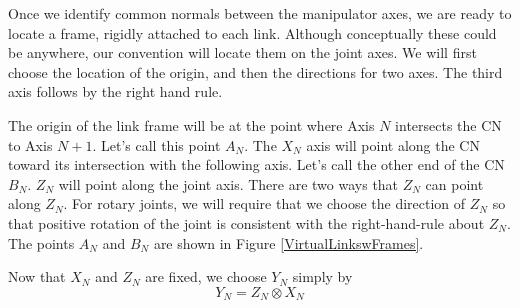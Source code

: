 Once we identify common normals between the manipulator axes, we are ready to locate a frame, rigidly attached to each link.  Although conceptually these could be anywhere, our convention will locate them on the joint axes.  We will  first choose the location of the origin, and then the directions for two axes.   The third axis follows by the right hand rule.


The origin of the link frame will be at the point where Axis $N$ intersects the CN to Axis $N+1$.  Let's call this point $A_N$.    The $X_N$ axis will point along the CN toward its intersection with the following axis.  Let's call the other end of the CN $B_N$.   $Z_N$ will point along the joint axis.  There are two ways that $Z_N$ can point along $Z_N$.    For rotary joints, we will require that we choose the direction of $Z_N$ so that positive rotation of the joint is consistent with the right-hand-rule about $Z_N$.  The points $A_N$ and $B_N$ are shown in Figure \ref{VirtualLinkswFrames}.

Now that $X_N$ and $Z_N$ are fixed, we choose $Y_N$ simply by
\[
Y_N = Z_N \otimes X_N
\]

